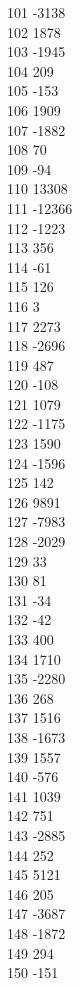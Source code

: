 { 101	-3138 \\
 102	1878 \\
 103	-1945 \\
 104	209 \\
 105	-153 \\
 106	1909 \\
 107	-1882 \\
 108	70 \\
 109	-94 \\
 110	13308 \\
 111	-12366 \\
 112	-1223 \\
 113	356 \\
 114	-61 \\
 115	126 \\
 116	3 \\
 117	2273 \\
 118	-2696 \\
 119	487 \\
 120	-108 \\
 121	1079 \\
 122	-1175 \\
 123	1590 \\
 124	-1596 \\
 125	142 \\
 126	9891 \\
 127	-7983 \\
 128	-2029 \\
 129	33 \\
 130	81 \\
 131	-34 \\
 132	-42 \\
 133	400 \\
 134	1710 \\
 135	-2280 \\
 136	268 \\
 137	1516 \\
 138	-1673 \\
 139	1557 \\
 140	-576 \\
 141	1039 \\
 142	751 \\
 143	-2885 \\
 144	252 \\
 145	5121 \\
 146	205 \\
 147	-3687 \\
 148	-1872 \\
 149	294 \\
 150	-151 \\
}
